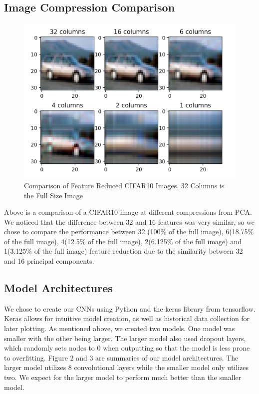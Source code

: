 \documentclass{article}
\begin{document}
\subsection{Image Compression Comparison}
\begin{figure}[!htb]
	\includegraphics[width=\linewidth]{figures/compressed_imgs.png}
	\caption{Comparison of Feature Reduced CIFAR10 Images. 32 Columns is the Full Size Image}
\end{figure}

Above is a comparison of a CIFAR10 image at different compressions from PCA. We noticed that the difference between 32 and 16 features was very similar, so we chose to compare the performance between 32 (100\% of the full image), 6(18.75\% of the full image), 4(12.5\% of the full image), 2(6.125\% of the full image) and 1(3.125\% of the full image) feature reduction due to the similarity between 32 and 16 principal components. 
\subsection{Model Architectures}
We chose to create our CNNs using Python and the keras library from tensorflow. Keras allows for intuitive model creation, as well as historical data collection for later plotting. As mentioned above, we created two models. One model was smaller with the other being larger. The larger model also used dropout layers, which randomly sets nodes to 0 when outputting so that the model is less prone to overfitting. Figure 2 and 3 are summaries of our model architectures. The larger model utilizes 8 convolutional layers while the smaller model only utilizes two. We expect for the larger model to perform much better than the smaller model.
\end{document}
